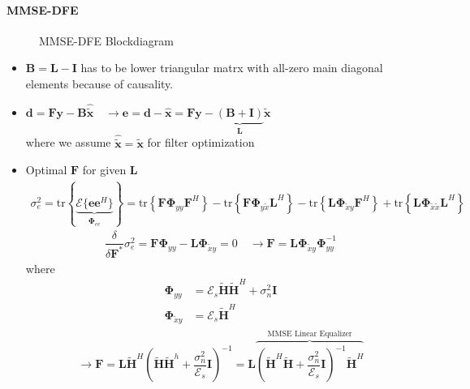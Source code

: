 \documentclass[a4paper, 10pt]{article}
\begin{document}
\paragraph{MMSE-DFE}
\begin{figure}[h]
	\centering
	
	\caption{MMSE-DFE Blockdiagram}
	\label{fig:MMSE_DFE.pstex_t}
\end{figure}
\begin{itemize}
	\item $\mathbf{B}=\mathbf{L}-\mathbf{I}$ has to be lower triangular matrx with all-zero main diagonal elements because of causality.
	\item $\mathbf{d}=\mathbf{Fy}-\mathbf{B}\hat{\tilde{\mathbf{x}}} \quad \rightarrow \mathbf{e}=\mathbf{d}-\hat{\mathbf{x}}=\mathbf{Fy}-\underbrace{(\mathbf{B}+\mathbf{I})}_{\mathbf{L}}\tilde{\mathbf{x}}$\\
	where we assume $\hat{\tilde{\mathbf{x}}}=\tilde{\mathbf{x}}$ for filter optimization
	\item Optimal $\mathbf{F}$ for given $\mathbf{L}$ \\
	\begin{align*}
		\sigma_e^2=\mathrm{tr}\left\{\underbrace{\mathcal{E}\{\mathbf{ee}^H\} }_{\boldsymbol{\Phi}_{ee}}\right\}
		=\mathrm{tr}\left\{\mathbf{F}\boldsymbol{\Phi}_{yy}\mathbf{F}^H\right\}-\mathrm{tr}\left\{\mathbf{F}\boldsymbol{\Phi}_{y \tilde{x}}\mathbf{L}^H\right\}
		-\mathrm{tr}\left\{\mathbf{L}\boldsymbol{\Phi}_{\tilde{x} y}\mathbf{F}^H\right\}
		+\mathrm{tr}\left\{\mathbf{L}\boldsymbol{\Phi}_{\tilde{x} \tilde{x}}\mathbf{L}^H\right\}
	\end{align*}
	\begin{align*}
		\dfrac{\delta}{\delta \mathbf{F}^*}\sigma_e^2=\mathbf{F}\boldsymbol{\Phi}_{yy}-\mathbf{L}\boldsymbol{\Phi}_{\tilde{x}y}=0 \quad \rightarrow \mathbf{F}
		=\mathbf{L}\boldsymbol{\Phi}_{\tilde{x}y}\boldsymbol{\Phi}_{yy}^{-1}
	\end{align*}
	where
	\begin{align*}
		\boldsymbol{\Phi}_{yy}&=\mathcal{E}_s\tilde{\mathbf{H}}\tilde{\mathbf{H}}^H+\sigma_n^2\mathbf{I}\\
		\boldsymbol{\Phi}_{\tilde{x}y}&=\mathcal{E}_s\tilde{\mathbf{H}}^H
	\end{align*}
	\begin{align*}
		\rightarrow \mathbf{F}=\mathbf{L}\tilde{\mathbf{H}}^H(\tilde{\mathbf{H}}\tilde{\mathbf{H}}^h+\dfrac{\sigma_n^2}{\mathcal{E}_s}\mathbf{I})^{-1}
		=\mathbf{L}\overbrace{(\tilde{\mathbf{H}}^H\tilde{\mathbf{H}}+\dfrac{\sigma_n^2}{\mathcal{E}_s}\mathbf{I})^{-1}\tilde{\mathbf{H}}^H}^{\text{MMSE Linear Equalizer}}

\end{align*}
\end{itemize}
\end{document}
